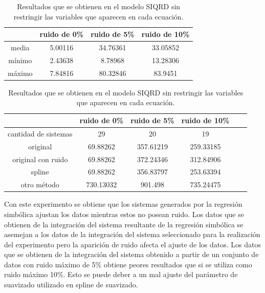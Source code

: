 \begin{table}[!h]
    \centering
    \caption{Resultados que se obtienen en el modelo SIQRD sin restringir las variables que aparecen en cada ecuación.}
    \begin{tabular}{|c|c|c|c|}
        \hline
               & \textbf{ruido de 0\%} & \textbf{ruido de 5\%} & \textbf{ruido de 10\%} \\
        \hline
        media  & 5.00116               & 34.76361              & 33.05852               \\
        \hline
        mínimo & 2.43638               & 8.78968               & 13.28306               \\
        \hline
        máximo & 7.84816               & 80.32846              & 83.9451                \\
        \hline
    \end{tabular}

    \begin{tabular}{|c|c|c|c|c|c|}
        \hline
                             & \textbf{ruido de 0\%} & \textbf{ruido de 5\%} & \textbf{ruido de 10\%} \\
        \hline
        cantidad de sistemas & 29                    & 20                    & 19                     \\
        \hline
        original             & 69.88262              & 357.61219             & 259.33185              \\
        \hline
        original con ruido   & 69.88262              & 372.24346             & 312.84906              \\
        \hline
        spline               & 69.88262              & 356.83797             & 253.63394              \\
        \hline
        otro método          & 730.13032             & 901.498               & 735.24475              \\
        \hline
    \end{tabular}
    \label{table:experiment_SIQRD_all}
\end{table}

Con este experimento se obtiene que los sistemas generados por la regresión simbólica ajustan los datos mientras estos no posean ruido. Los datos que se obtienen de la integración del sistema resultante de la regresión simbólica se asemejan a los datos de la integración del sistema seleccionado para la realización del experimento pero la aparición de ruido afecta el ajuste de los datos. Los datos que se obtienen de la integración del sistema obtenido a partir de un conjunto de datos con ruido máximo de 5\% obtiene peores resultados que si se utiliza como ruido máximo 10\%. Esto se puede deber a un mal ajuste del parámetro de suavizado utilizado en spline de suavizado.

